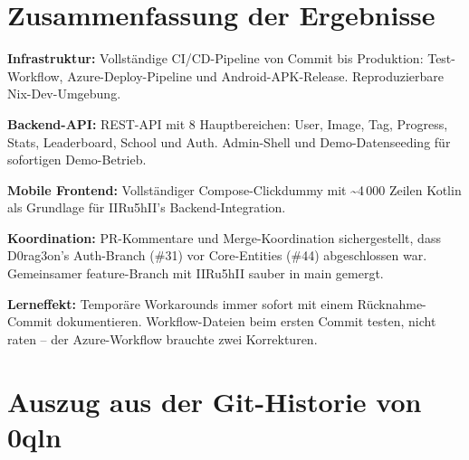 \section{Zusammenfassung der Ergebnisse}

\textbf{Infrastruktur:}
Vollständige CI/CD-Pipeline von Commit bis Produktion:
Test-Workflow, Azure-Deploy-Pipeline und Android-APK-Release.
Reproduzierbare Nix-Dev-Umgebung.

\textbf{Backend-API:}
REST-API mit 8 Hauptbereichen: User, Image, Tag, Progress, Stats,
Leaderboard, School und Auth.
Admin-Shell und Demo-Datenseeding für sofortigen Demo-Betrieb.

\textbf{Mobile Frontend:}
Vollständiger Compose-Clickdummy mit \textasciitilde{}4\,000 Zeilen Kotlin
als Grundlage für IIRu5hII's Backend-Integration.

\textbf{Koordination:}
PR-Kommentare und Merge-Koordination sichergestellt, dass D0rag3on's Auth-Branch
(\#31) vor Core-Entities (\#44) abgeschlossen war.
Gemeinsamer feature-Branch mit IIRu5hII sauber in main gemergt.

\textbf{Lerneffekt:}
Temporäre Workarounds immer sofort mit einem Rücknahme-Commit dokumentieren.
Workflow-Dateien beim ersten Commit testen, nicht raten –
der Azure-Workflow brauchte zwei Korrekturen.

\section{Auszug aus der Git-Historie von 0qln}

